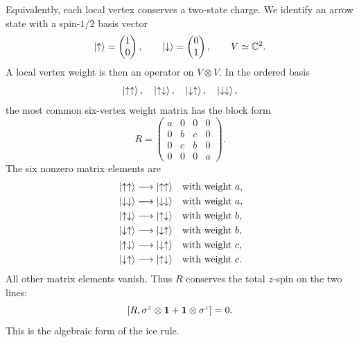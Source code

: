 Equivalently, each local vertex conserves a two-state charge.  We identify an
arrow state with a spin-$1/2$ basis vector
\begin{equation}
    \left|\uparrow\right\rangle=\begin{pmatrix}1\\0\end{pmatrix},
    \qquad
    \left|\downarrow\right\rangle=\begin{pmatrix}0\\1\end{pmatrix},
    \qquad
    V\simeq \mathbb{C}^2 .
\end{equation}
A local vertex weight is then an operator on $V\otimes V$.  In the ordered basis
\begin{equation}
    \left|\uparrow\uparrow\right\rangle,
    \quad
    \left|\uparrow\downarrow\right\rangle,
    \quad
    \left|\downarrow\uparrow\right\rangle,
    \quad
    \left|\downarrow\downarrow\right\rangle,
\end{equation}
the most common six-vertex weight matrix has the block form
\begin{equation}
\label{eq:six-vertex-constant-R-matrix}
    R=
    \begin{pmatrix}
        a&0&0&0\\
        0&b&c&0\\
        0&c&b&0\\
        0&0&0&a
    \end{pmatrix}.
\end{equation}
The six nonzero matrix elements are
\begin{equation}
\label{eq:six-vertex-six-nonzero-weights}
\begin{aligned}
    &\left|\uparrow\uparrow\right\rangle\longrightarrow\left|\uparrow\uparrow\right\rangle
    &&\text{with weight }a,\\
    &\left|\downarrow\downarrow\right\rangle\longrightarrow\left|\downarrow\downarrow\right\rangle
    &&\text{with weight }a,\\
    &\left|\uparrow\downarrow\right\rangle\longrightarrow\left|\uparrow\downarrow\right\rangle
    &&\text{with weight }b,\\
    &\left|\downarrow\uparrow\right\rangle\longrightarrow\left|\downarrow\uparrow\right\rangle
    &&\text{with weight }b,\\
    &\left|\uparrow\downarrow\right\rangle\longrightarrow\left|\downarrow\uparrow\right\rangle
    &&\text{with weight }c,\\
    &\left|\downarrow\uparrow\right\rangle\longrightarrow\left|\uparrow\downarrow\right\rangle
    &&\text{with weight }c.
\end{aligned}
\end{equation}
All other matrix elements vanish.  Thus $R$ conserves the total $z$-spin on the
two lines:
\begin{equation}
\label{eq:six-vertex-U1-conservation-local}
    \left[ R,\sigma^z\otimes\mathbf{1}+\mathbf{1}\otimes\sigma^z\right]=0 .
\end{equation}
This is the algebraic form of the ice rule.

